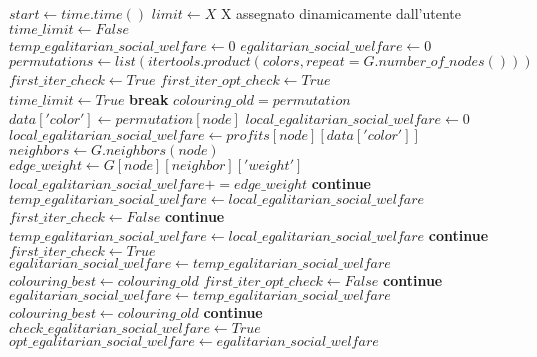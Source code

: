 \newpage
\begin{algorithmic}

\State $start\gets time.time()$
\State $limit\gets X$ \Comment X assegnato dinamicamente dall'utente
\State $time\_limit\gets False$ \\

\State $temp\_egalitarian\_social\_welfare\gets 0$
\State $egalitarian\_social\_welfare\gets 0$
\State $permutations\gets list(itertools.product(colors, repeat=G.number\_of\_nodes()))$
\State $first\_iter\_check\gets True$
\State $first\_iter\_opt\_check\gets True$ \\

		\State $time\_limit\gets True$ 
		\State \textbf{break}
	\EndIf
	\State $colouring\_old = permutation$
		\State $data['color']\gets permutation[node]$
	\EndFor
		\State $local\_egalitarian\_social\_welfare\gets 0$
		\State $local\_egalitarian\_social\_welfare\gets profits[node][data['color']]$
		\State $neighbors\gets G.neighbors(node)$
				\State $edge\_weight\gets G[node][neighbor]['weight']$
				\State $local\_egalitarian\_social\_welfare += edge\_weight$
			\Else
				\State \textbf{continue}
			\EndIf
		\EndFor
			\State $temp\_egalitarian\_social\_welfare\gets local\_egalitarian\_social\_welfare$
			\State $first\_iter\_check\gets False$
			\State \textbf{continue}
		\EndIf	
			\State $temp\_egalitarian\_social\_welfare\gets local\_egalitarian\_social\_welfare$
		\Else
			\State \textbf{continue}	
		\EndIf
	\State $first\_iter\_check\gets True$
		\State $egalitarian\_social\_welfare\gets temp\_egalitarian\_social\_welfare$
		\State $colouring\_best\gets colouring\_old$
		\State $first\_iter\_opt\_check\gets False$
		\State \textbf{continue}
	\EndIf	
		\State $egalitarian\_social\_welfare\gets temp\_egalitarian\_social\_welfare$
		\State $colouring\_best\gets colouring\_old$
	\Else
		\State \textbf{continue}	
	\EndIf
	\EndFor
\EndFor \\

	\State $check\_egalitarian\_social\_welfare\gets True$
	\State $opt\_egalitarian\_social\_welfare\gets egalitarian\_social\_welfare$
\EndIf

\end{algorithmic}

